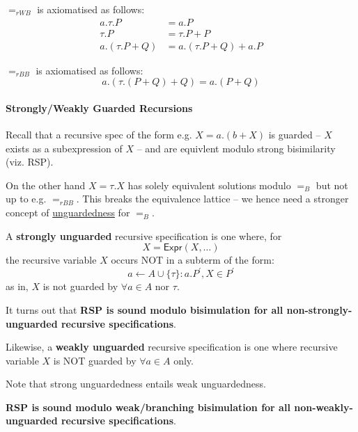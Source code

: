 \documentclass[99-notes-packed.tex]{subfiles}
\begin{document}
\begin{definition} 
    $=_{rWB}$ is axiomatised as follows: 
    \begin{align}
        a.\tau.P &= a.P \\
        \tau.P &= \tau.P + P \\
        a.(\tau.P + Q) &= a.(\tau.P + Q) + a.P
    \end{align}

    $=_{rBB}$ is axiomatised as follows: 
    \begin{equation*}
        a.(\tau.(P + Q) + Q) = a.(P + Q)
    \end{equation*}
\end{definition}

\paragraph*{Strongly/Weakly Guarded Recursions}
Recall that a recursive spec of the form e.g. $X = a.(b + X)$ is guarded -- $X$ exists as a subexpression of $X$ -- and are equivlent modulo strong bisimilarity (viz. RSP). 

On the other hand $X = \tau.X$ has solely equivalent solutions modulo $=_{B}$ but not up to e.g. $=_{rBB}$. This breaks the equivalence lattice -- we hence need a stronger concept of \underline{unguardedness} for $=_{B}$.

\begin{definition}
    A \textbf{strongly unguarded} recursive specification is one where, for
    \begin{equation*}
        X = \mathsf{Expr}(X, \dots)
    \end{equation*}
    the recursive variable $X$ occurs NOT in a subterm of the form: 
    \begin{equation*}
        a \leftarrow A \cup \{\tau\}: a.P^{'}, X \in P^{'}
    \end{equation*}
    as in, $X$ is not guarded by $\forall a \in A$ nor $\tau$. 

    It turns out that \textbf{RSP is sound modulo bisimulation for all non-strongly-unguarded recursive specifications}. 
\end{definition}

\begin{definition}
    Likewise, a \textbf{weakly unguarded} recursive specification is one where recursive variable $X$ is NOT guarded by $\forall a \in A$ only. 

    Note that strong unguardedness entails weak unguardedness.

    \textbf{RSP is sound modulo weak/branching bisimulation for all non-weakly-unguarded recursive specifications}. 
\end{definition}
\end{document}
